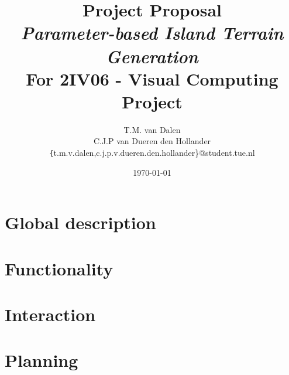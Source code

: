 \documentclass[11pt,a4paper,twocolumn]{article}
\title{
	{\huge Project Proposal\\ \emph{Parameter-based Island Terrain Generation}}\\
	{\large For 2IV06 - Visual Computing Project}
}
\author{
	T.M. van Dalen \\
	C.J.P van Dueren den Hollander\\
	{\texttt\{t.m.v.dalen,c.j.p.v.dueren.den.hollander\}}@student.tue.nl
}
\date{\today}
\begin{document}
	\maketitle
	
	
	
	\section{Global description}
	\label{sec:desc}
	

	\section{Functionality}
	\label{sec:func}
	

	\section{Interaction}
	\label{sec:interaction}
	

	\section{Planning}
	\label{sec:planning}
	

	
	
\end{document}
